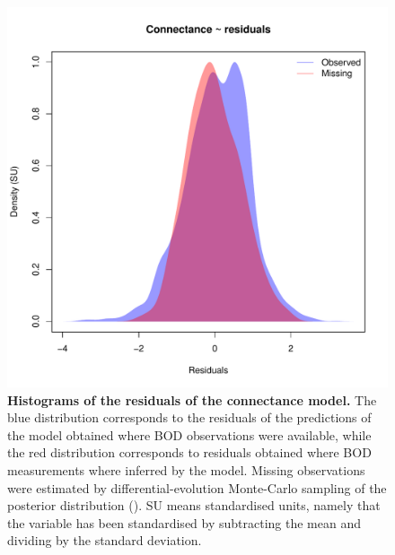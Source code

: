 \documentclass[11pt, oneside]{article}
\begin{document}
\begin{figure}[H]
\begin{center}
\includegraphics[page=1, width=1\linewidth]{b0_6_2/out_con/fig_hist_residuals.pdf}
\caption{
    \textbf{Histograms of the residuals of the connectance model.}
    The blue distribution corresponds to the residuals of the predictions of the model obtained where BOD observations were available, while the red distribution corresponds to residuals obtained where BOD measurements where inferred by the model.
    Missing observations were estimated by differential-evolution Monte-Carlo sampling of the posterior distribution (\cite{TerBraak2006}).
    SU means standardised units, namely that the variable has been standardised by subtracting the mean and dividing by the standard deviation.
} 
\end{center}
\end{figure}
\end{document}
